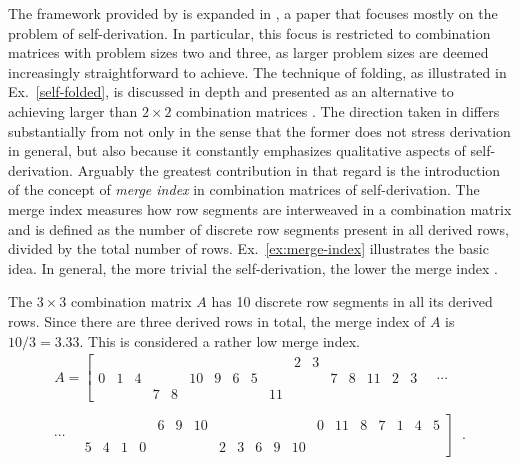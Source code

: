 The framework provided by \cite{Starr1984} is expanded in \cite{Kowalski1987a}, a paper that focuses mostly on the problem of self-derivation. In particular, this focus is restricted to combination matrices with problem sizes two and three, as larger problem sizes are deemed increasingly straightforward to achieve. The technique of folding, as illustrated in Ex.~\ref{self-folded}, is discussed in depth and presented as an alternative to achieving larger than $2 \times 2$ combination matrices \cite[298]{Kowalski1987a}. The direction taken in \cite{Kowalski1987a} differs substantially from \cite{Starr1984} not only in the sense that the former does not stress derivation in general, but also because it constantly emphasizes qualitative aspects of self-derivation. Arguably the greatest contribution in that regard is the introduction of the concept of \emph{merge index} in combination matrices of self-derivation. The merge index measures how row segments are interweaved in a combination matrix and is defined as the number of discrete row segments present in all derived rows, divided by the total number of rows. Ex.~\ref{ex:merge-index} illustrates the basic idea. In general, the more trivial the self-derivation, the lower the merge index \cite[310]{Kowalski1987a}.

\begin{example}
	\cite[314]{Kowalski1987a}
	\label{ex:merge-index}
    The $3 \times 3$ combination matrix $A$ has 10 discrete row segments in all its derived rows. Since there are three derived rows in total, the merge index of $A$ is $10 / 3 = 3.33$. This is considered a rather low merge index.
    \newpage
    \begin{multline}
        A = \left[
        \begin{array}{cccccccccccc|ccccc}
        &&&&&&&&&& 2 & 3 &&&&& \\
        0 & 1 & 4 &&& 10 & 9 & 6 & 5 &&&& 7 & 8 & 11 & 2 & 3 \\
        &&& 7 & 8 &&&&& 11 &&&&&&&
        \end{array}
        \right. \quad \cdots \\\\
        \cdots \left. \quad
        \begin{array}{ccccccc|cccccccccccc}
        &&&& 6 & 9 & 10 &&&&&& 0 & 11 & 8 & 7 & 1 & 4 & 5 \\
        &&&&&&&&&&&&&&&&&& \\
        5 & 4 & 1 & 0 &&&& 2 & 3 & 6 & 9 & 10 &&&&&&&
        \end{array}
        \right] \enspace.
    \end{multline}
\end{example}

